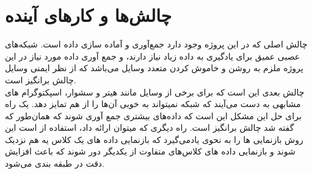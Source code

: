 \documentclass[12pt,onecolumn,a4paper]{article}
\begin{document}
\section{چالش‌ها و کارهای آینده}
چالش اصلی که در این پروژه وجود دارد جمع‌آوری و آماده سازی داده‌ است. شبکه‌های عصبی عمیق برای یادگیری به داده زیاد نیاز دارند، و جمع آوری داده مورد نیاز در این پروژه ملزم به روشن و خاموش کردن متعدد وسایل می‌باشد که از نظر ایمنی وسایل چالش برانگیز است.\\
چالش بعدی این است که برای برخی از وسایل مانند هیتر و سشوار، اسپکتوگرام های مشابهی به دست می‌آیند که شبکه نمیتواند به خوبی آن‌ها را از هم تمایز دهد. یک راه برای حل این مشکل این است که داده‌های بیشتری جمع آوری شوند که همان‌طور که گفته شد چالش برانگیز است. راه دیگری که میتوان ارائه داد، استفاده از 
است این روش بازنمایی ها را به نحوی یادمی‌گیرد که بازنمایی داده های یک کلاس یه هم نزدیک شوند و بازنمایی داده‌ های کلاس‌های متفاوت از یکدیگر دور شوند که باعث افزایش دقت در طبقه بندی می‌شود.
\end{document}
